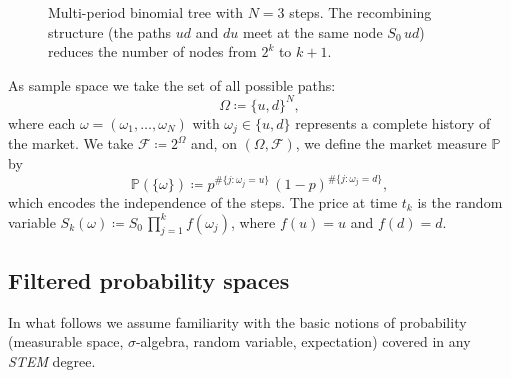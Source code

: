 \documentclass[11pt,a4paper,oneside]{report}
\theoremstyle{plain}
\theoremstyle{definition}
\theoremstyle{remark}
\newcommand{\PP}{\mathbb{P}}
\newcommand{\F}{\mathcal{F}}
\newcommand{\1}{\mathbf{1}}
\newcommand{\eqdef}{\coloneqq}
\begin{document}
\begin{figure}[h]
\centering
{}
\caption{Multi-period binomial tree with $N = 3$ steps. The recombining
structure (the paths $ud$ and $du$ meet at the same node $S_0\,ud$)
reduces the number of nodes from $2^k$ to $k+1$.}
\label{fig:arbol_binomial}
\end{figure}

As sample space we take the
set of all possible paths:
\begin{equation*}
  \Omega \eqdef \{u, d\}^N,
\end{equation*}
where each $\omega = (\omega_1, \ldots, \omega_N)$ with
$\omega_j \in \{u, d\}$ represents a complete history of the market.
We take $\F \eqdef 2^{\Omega}$ and, on $(\Omega, \F)$, we define the
market measure $\PP$ by
\begin{equation*}
  \PP(\{\omega\}) \eqdef p^{\#\{j: \omega_j = u\}}\,
                        (1-p)^{\#\{j: \omega_j = d\}},
\end{equation*}
which encodes the independence of the steps. The price at time $t_k$
is the random variable
$S_k(\omega) \eqdef S_0\, \prod_{j=1}^k f(\omega_j)$, where $f(u) = u$
and $f(d) = d$.

\subsection{Filtered probability spaces}
\label{subsec:filtraciones}

In what follows we assume familiarity with the basic notions of
probability (measurable space, $\sigma$-algebra, random variable,
expectation) covered in any \emph{STEM} degree.
\end{document}
